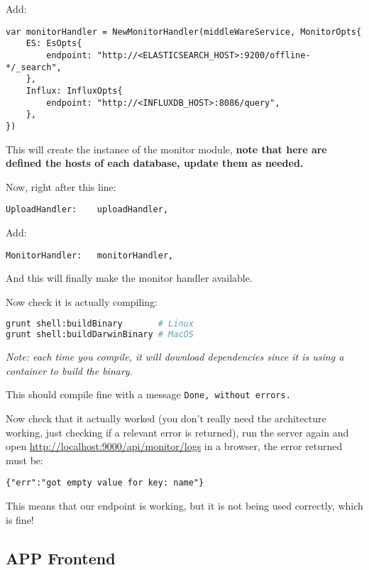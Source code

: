 Add:

\begin{lstlisting}[language=Golang]
var monitorHandler = NewMonitorHandler(middleWareService, MonitorOpts{
	ES: EsOpts{
		endpoint: "http://<ELASTICSEARCH_HOST>:9200/offline-*/_search",
	},
	Influx: InfluxOpts{
		endpoint: "http://<INFLUXDB_HOST>:8086/query",
	},
})
\end{lstlisting}

This will create the instance of the monitor module, \textbf{note that here are defined the hosts of each database, update them as needed.}

Now, right after this line:

\begin{lstlisting}[language=Golang]
UploadHandler:    uploadHandler,
\end{lstlisting}

Add:

\begin{lstlisting}[language=Golang]
MonitorHandler:   monitorHandler,
\end{lstlisting}

And this will finally make the monitor handler available.

Now check it is actually compiling:

\begin{lstlisting}[language=bash]
grunt shell:buildBinary       # Linux
grunt shell:buildDarwinBinary # MacOS
\end{lstlisting}

\begin{center}
\textit{Note: each time you compile, it will download dependencies since it is using a container to build the binary.}
\end{center}

This should compile fine with a message \texttt{Done, without errors.}

Now check that it actually worked (you don't really need the architecture working, just checking if a relevant error is returned), run the server again and open \url{http://localhost:9000/api/monitor/logs} in a browser, the error returned must be:

\begin{lstlisting}
{"err":"got empty value for key: name"}
\end{lstlisting}

This means that our endpoint is working, but it is not being used correctly, which is fine!

\subsection{APP Frontend}

